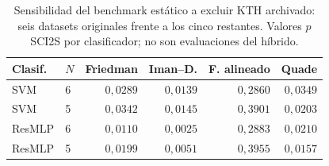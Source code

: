 \begin{table}[!htbp]
\centering\fontsize{8}{10}\selectfont
\caption{Sensibilidad del benchmark estático a excluir KTH archivado: seis datasets originales frente a los cinco restantes. Valores $p$ SCI2S por clasificador; no son evaluaciones del híbrido.}
\label{tab:kth-sensibilidad-global}
\begin{tabular}{@{}llrrrr@{}}
\toprule
Clasif. & $N$ & Friedman & Iman--D. & F. alineado & Quade\\
\midrule
SVM & 6 & $0{,}0289$ & $0{,}0139$ & $0{,}2860$ & $0{,}0349$\\
SVM & 5 & $0{,}0342$ & $0{,}0145$ & $0{,}3901$ & $0{,}0203$\\
ResMLP & 6 & $0{,}0110$ & $0{,}0025$ & $0{,}2883$ & $0{,}0210$\\
ResMLP & 5 & $0{,}0199$ & $0{,}0051$ & $0{,}3955$ & $0{,}0157$\\
\bottomrule
\end{tabular}
\end{table}
